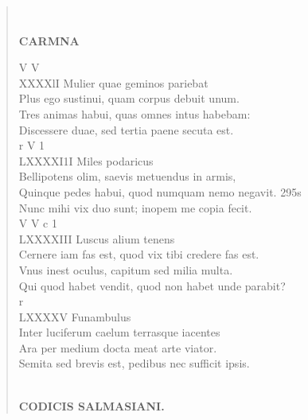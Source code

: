 \documentclass[11pt, a4paper]{report}
\begin{document}
\begin{verse}
        ﻿\pagebreak 
    \begin{center} \textbf{CARMNA} \end{center} \marginpar{[244]} V V \\ XXXXlI Mulier quae geminos pariebat \\ Plus ego sustinui, quam corpus debuit unum. \\ Tres animas habui, quas omnes intus habebam: \\ Discessere duae, sed tertia paene secuta est. \\ r V 1 \\ LXXXXI1I Miles podaricus \\ Bellipotens olim, saevis metuendus in armis, \\ Quinque pedes habui, quod numquam nemo negavit. 295s \\ Nunc mihi vix duo sunt; inopem me copia fecit. \\ V V c 1 \\ LXXXXIII Luscus alium tenens \\ Cernere iam fas est, quod vix tibi credere fas est. \\ Vnus inest oculus, capitum sed milia multa. \\ Qui quod habet vendit, quod non habet unde parabit? \\ r \\ LXXXXV Funambulus \\ Inter luciferum caelum terrasque iacentes \\ Ara per medium docta meat arte viator. \\ Semita sed brevis est, pedibus nec sufficit ipsis. \\ 
        ﻿\pagebreak 
    \begin{center} \textbf{CODICIS SALMASIANI.} \end{center} \marginpar{[245]} 
      \end{verse}
  
\end{document}
